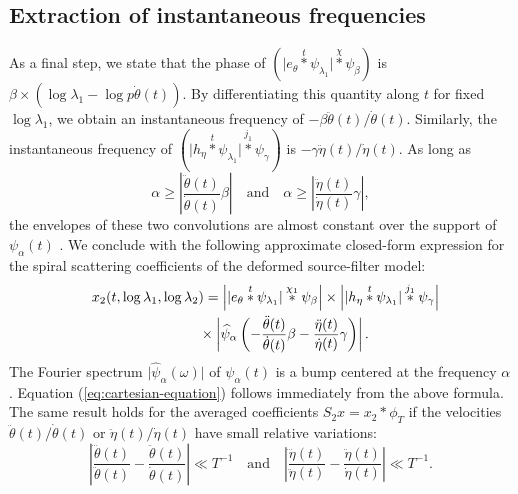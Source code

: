 \documentclass[twoside,a4paper]{article}
\begin{document}
\subsection{Extraction of instantaneous frequencies}
As a final step, we state that the phase of $( \vert e_\theta \overset{t}{\ast} \psi_{\lambda_1} \vert \overset{\chi}{\ast} \psi_{\beta} )$ is $\beta\times(\log \lambda_1 - \log p \dot{\theta}(t))$. By differentiating this quantity along $t$ for fixed $\log \lambda_1$, we obtain an instantaneous frequency of $- \beta \ddot{\theta}(t)/\dot{\theta}(t)$. Similarly, the instantaneous frequency of $( \vert h_\eta \overset{t}{\ast} \psi_{\lambda_1} \vert \overset{j_{1}}{\ast} \psi_{\gamma} )$ is $ - \gamma \ddot{\eta}(t)/\dot{\eta}(t)$. As long as
\begin{equation}
\alpha \geq \left \vert \frac{\ddot{\theta}(t)}{\dot{\theta}(t)} \beta \right \vert
\quad
\text{and}
\quad
\alpha \geq \left \vert \frac{\ddot{\eta}(t)}{\dot{\eta}(t)} \gamma \right \vert,
\end{equation}
the envelopes of these two convolutions are almost constant over the support of $\psi_{\alpha}(t)$ \cite{Delprat1992}. We conclude with the following approximate closed-form expression for the spiral scattering coefficients of the deformed source-filter model:
\begin{eqnarray}
\mkern-60mu
x_2(t,\log \lambda_1, \log \lambda_2) = 
\Big\vert \vert e_\theta \overset{t}{\ast} \psi_{\lambda_1} \vert \overset{\chi_1}{\ast} \psi_{\beta} \Big\vert
\times
\Big\vert \vert h_\eta \overset{t}{\ast} \psi_{\lambda_1} \vert \overset{j_1}{\ast} \psi_{\gamma} \Big\vert \nonumber \mkern-310mu \\
& \times \left \vert \widehat{\psi}_{\alpha} \left( -\dfrac{\ddot{\theta}(t)}{\dot{\theta}(t)} \beta - \dfrac{\ddot{\eta}(t)}{\dot{\eta}(t)} \gamma \right) \right \vert.
\label{eq:x2-sourcefilter}
\end{eqnarray}
The Fourier spectrum $\vert \widehat{\psi}_\alpha(\omega) \vert$ of $\psi_\alpha(t)$ is a bump centered at the frequency $\alpha$. Equation (\ref{eq:cartesian-equation}) follows immediately from the above formula. The same result holds for the averaged coefficients $S_2 x = x_2 \ast \phi_T$ if the velocities $\ddot{\theta}(t)/\dot{\theta}(t)$ or $\ddot{\eta}(t)/\dot{\eta}(t)$ have small relative variations:
\begin{equation}
\left \vert \frac{\dddot{\theta}(t)}{\ddot{\theta}(t)} - \frac{\ddot{\theta}(t)}{\dot{\theta}(t)} \right \vert \ll T^{-1}
\quad \text{and} \quad
\left \vert \frac{\dddot{\eta}(t)}{\ddot{\eta}(t)} - \frac{\ddot{\eta}(t)}{\dot{\eta}(t)} \right \vert \ll T^{-1}.
\end{equation}
\end{document}
